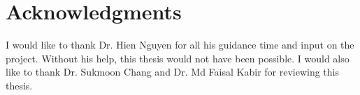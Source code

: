 \chapter*{Acknowledgments}

I would like to thank Dr. Hien Nguyen for all his guidance time and input on the project. Without his help, this thesis would not have been possible. I would also like to thank Dr. Sukmoon Chang and Dr. Md Faisal Kabir for reviewing this thesis. 
